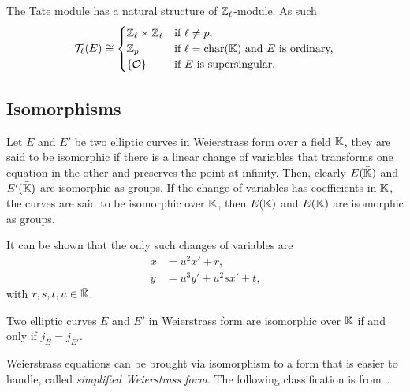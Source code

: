\begin{proposition}
  The Tate module has a natural structure of
  $\mathbb{Z}_\ell$-module. As such
  \begin{equation}
    \label{eq:134}
    \mathcal{T}_\ell(E) \cong
    \begin{cases}
      \mathbb{Z}_\ell\times\mathbb{Z}_\ell &\text{if $\ell\ne p$,}\\
      \mathbb{Z}_p &\text{if $\ell=\operatorname{char}(\mathbb{K})$ and $E$ is ordinary,}\\
      \{\mathcal{O}\} &\text{if $E$ is supersingular.}
    \end{cases}
  \end{equation}
\end{proposition}


\subsection{Isomorphisms}
\label{sec:isomorphisms}

Let $E$ and $E'$ be two elliptic curves in Weierstrass form over a
field $\mathbb{K}$, they are said to be isomorphic if there is a linear change
of variables that transforms one equation in the other and preserves
the point at infinity.  Then, clearly $E(\bar{\mathbb{K}})$ and
$E'(\bar{\mathbb{K}})$ are isomorphic as groups. If the change of variables
has coefficients in $\mathbb{K}$, the curves are said to be
isomorphic
over $\mathbb{K}$, then $E(\mathbb{K})$ and $E(\mathbb{K})$ are isomorphic as groups.

It can be shown that the only such changes of variables are
\begin{equation}
  \label{eq:116}
  \begin{aligned}
    x &= u^2x' + r\text{,}\\
    y &= u^3y' + u^2sx' + t\text{,}
  \end{aligned}
\end{equation}
with $r,s,t,u\in\bar{\mathbb{K}}$.

\begin{proposition}
  Two elliptic curves $E$ and $E'$ in Weierstrass form are isomorphic
  over $\bar{\mathbb{K}}$ if and only if $j_E=j_{E'}$.
\end{proposition}

Weierstrass equations can be
brought via isomorphism to a form that is easier to handle, called
\emph{simplified Weierstrass form}. The following classification is
from~\cite{connell:elliptic}.

